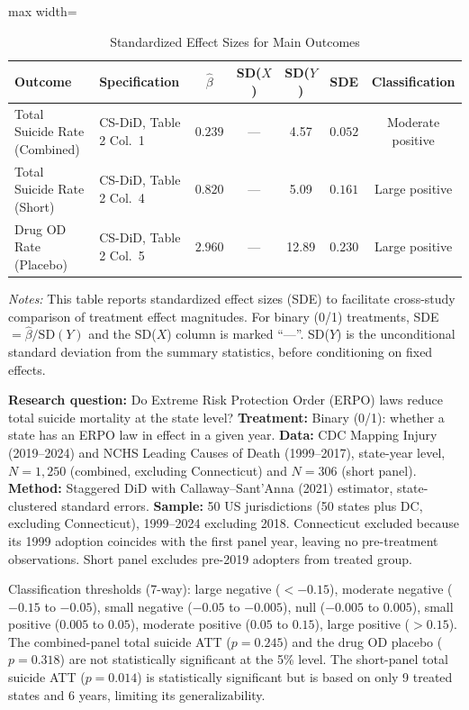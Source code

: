 \documentclass[12pt]{article}
\begin{document}
\begin{table}[H]
\centering
\caption{Standardized Effect Sizes for Main Outcomes}
\label{tab:sde}
\begin{adjustbox}{max width=\textwidth}
\begin{tabular}{llccccc}
\toprule
Outcome & Specification & $\hat{\beta}$ & SD($X$) & SD($Y$) & SDE & Classification \\
\midrule
Total Suicide Rate (Combined) & CS-DiD, Table 2 Col.\ 1 & $0.239$ & --- & 4.57 & $0.052$ & Moderate positive \\
Total Suicide Rate (Short) & CS-DiD, Table 2 Col.\ 4 & $0.820$ & --- & 5.09 & $0.161$ & Large positive \\
Drug OD Rate (Placebo) & CS-DiD, Table 2 Col.\ 5 & $2.960$ & --- & 12.89 & $0.230$ & Large positive \\
\bottomrule
\end{tabular}
\end{adjustbox}
\par\vspace{0.3em}
{\footnotesize \emph{Notes:} This table reports standardized effect sizes (SDE) to facilitate cross-study comparison of treatment effect magnitudes. For binary (0/1) treatments, SDE $= \hat{\beta} / \text{SD}(Y)$ and the SD($X$) column is marked ``---''. SD($Y$) is the unconditional standard deviation from the summary statistics, before conditioning on fixed effects.

\textbf{Research question:} Do Extreme Risk Protection Order (ERPO) laws reduce total suicide mortality at the state level?
\textbf{Treatment:} Binary (0/1): whether a state has an ERPO law in effect in a given year.
\textbf{Data:} CDC Mapping Injury (2019--2024) and NCHS Leading Causes of Death (1999--2017), state-year level, $N = 1{,}250$ (combined, excluding Connecticut) and $N = 306$ (short panel).
\textbf{Method:} Staggered DiD with Callaway--Sant'Anna (2021) estimator, state-clustered standard errors.
\textbf{Sample:} 50 US jurisdictions (50 states plus DC, excluding Connecticut), 1999--2024 excluding 2018. Connecticut excluded because its 1999 adoption coincides with the first panel year, leaving no pre-treatment observations. Short panel excludes pre-2019 adopters from treated group.

Classification thresholds (7-way): large negative ($< -0.15$), moderate negative ($-0.15$ to $-0.05$), small negative ($-0.05$ to $-0.005$), null ($-0.005$ to $0.005$), small positive ($0.005$ to $0.05$), moderate positive ($0.05$ to $0.15$), large positive ($> 0.15$). The combined-panel total suicide ATT ($p = 0.245$) and the drug OD placebo ($p = 0.318$) are not statistically significant at the 5\% level. The short-panel total suicide ATT ($p = 0.014$) is statistically significant but is based on only 9 treated states and 6 years, limiting its generalizability.}
\end{table}
\end{document}
